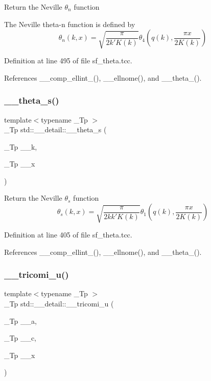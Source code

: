 Return the Neville $ \theta_n $ function

The Neville theta-\/n function is defined by \[ \theta_n(k,x) = \sqrt{\frac{\pi}{2k'K(k)}} \theta_4\left(q(k),\frac{\pi x}{2K(k)}\right) \] 

Definition at line 495 of file sf\+\_\+theta.\+tcc.



References \+\_\+\+\_\+comp\+\_\+ellint\+\_(), \+\_\+\+\_\+ellnome(), and \+\_\+\+\_\+theta\+\_().

\mbox{\label{namespacestd_1_1____detail_aeac5da2d394fafe6432871abf5c05413}} 
\subsubsection{\texorpdfstring{\+\_\+\+\_\+theta\+\_\+s()}{\_\_theta\_s()}}
{\footnotesize\ttfamily template$<$typename \+\_\+\+Tp $>$ \\
\+\_\+\+Tp std\+::\+\_\+\+\_\+detail\+::\+\_\+\+\_\+theta\+\_\+s (\begin{DoxyParamCaption}\item[{\+\_\+\+Tp}]{\+\_\+\+\_\+k,  }\item[{\+\_\+\+Tp}]{\+\_\+\+\_\+x }\end{DoxyParamCaption})}

Return the Neville $ \theta_s $ function \[ \theta_s(k,x) = \sqrt{\frac{\pi}{2 k k' K(k)}} \theta_1\left(q(k),\frac{\pi x}{2K(k)}\right) \] 

Definition at line 405 of file sf\+\_\+theta.\+tcc.



References \+\_\+\+\_\+comp\+\_\+ellint\+\_(), \+\_\+\+\_\+ellnome(), and \+\_\+\+\_\+theta\+\_().

\mbox{\label{namespacestd_1_1____detail_ae67133e463041158ebbffe6c54af6e0a}} 
\subsubsection{\texorpdfstring{\+\_\+\+\_\+tricomi\+\_\+u()}{\_\_tricomi\_u()}}
{\footnotesize\ttfamily template$<$typename \+\_\+\+Tp $>$ \\
\+\_\+\+Tp std\+::\+\_\+\+\_\+detail\+::\+\_\+\+\_\+tricomi\+\_\+u (\begin{DoxyParamCaption}\item[{\+\_\+\+Tp}]{\+\_\+\+\_\+a,  }\item[{\+\_\+\+Tp}]{\+\_\+\+\_\+c,  }\item[{\+\_\+\+Tp}]{\+\_\+\+\_\+x }\end{DoxyParamCaption})}



